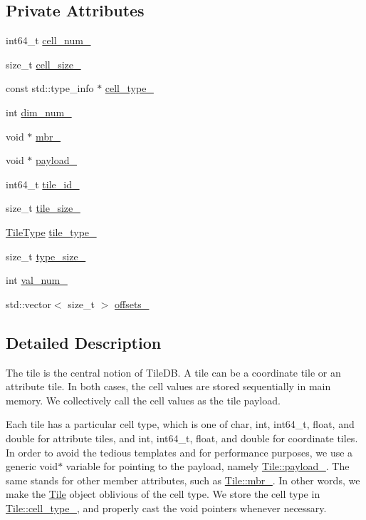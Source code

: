 \subsection*{Private Attributes}
\begin{DoxyCompactItemize}
\item 
int64\+\_\+t \hyperlink{classTile_a86e62b41be7955d73118fdc703ab84e5}{cell\+\_\+num\+\_\+}
\item 
size\+\_\+t \hyperlink{classTile_ae2cfbaf3e994027273c5ef0e73ed72f2}{cell\+\_\+size\+\_\+}
\item 
const std\+::type\+\_\+info $\ast$ \hyperlink{classTile_a9834351c4f87c33494c6938725285501}{cell\+\_\+type\+\_\+}
\item 
int \hyperlink{classTile_af1cc5abe87729af6774e2f15aac6f109}{dim\+\_\+num\+\_\+}
\item 
void $\ast$ \hyperlink{classTile_ab2ff00cb42ae4699447681611c1765f4}{mbr\+\_\+}
\item 
void $\ast$ \hyperlink{classTile_ab5aee226a2e8760db00f11b8b7ede0d2}{payload\+\_\+}
\item 
int64\+\_\+t \hyperlink{classTile_a2b9e15f1229efa4a2aff16b31ee38a29}{tile\+\_\+id\+\_\+}
\item 
size\+\_\+t \hyperlink{classTile_a7a57b326881fca47f8e60434929762fb}{tile\+\_\+size\+\_\+}
\item 
\hyperlink{classTile_a4d24e5edfa7092e2fd2d0f772e3e1433}{Tile\+Type} \hyperlink{classTile_aca1d244ab42a15bf20027943bafee10d}{tile\+\_\+type\+\_\+}
\item 
size\+\_\+t \hyperlink{classTile_a7bd705d7ae14035443f4e111d6d43f09}{type\+\_\+size\+\_\+}
\item 
int \hyperlink{classTile_ab5f3455de50e1e92d43730c120dbb9f1}{val\+\_\+num\+\_\+}
\item 
std\+::vector$<$ size\+\_\+t $>$ \hyperlink{classTile_a5cf35071b1a2f83cc2203d56c811548b}{offsets\+\_\+}
\end{DoxyCompactItemize}


\subsection{Detailed Description}
The tile is the central notion of Tile\+D\+B. A tile can be a coordinate tile or an attribute tile. In both cases, the cell values are stored sequentially in main memory. We collectively call the cell values as the tile payload.

Each tile has a particular cell type, which is one of char, int, int64\+\_\+t, float, and double for attribute tiles, and int, int64\+\_\+t, float, and double for coordinate tiles. In order to avoid the tedious templates and for performance purposes, we use a generic void$\ast$ variable for pointing to the payload, namely \hyperlink{classTile_ab5aee226a2e8760db00f11b8b7ede0d2}{Tile\+::payload\+\_\+}. The same stands for other member attributes, such as \hyperlink{classTile_ab2ff00cb42ae4699447681611c1765f4}{Tile\+::mbr\+\_\+}. In other words, we make the \hyperlink{classTile}{Tile} object oblivious of the cell type. We store the cell type in \hyperlink{classTile_a9834351c4f87c33494c6938725285501}{Tile\+::cell\+\_\+type\+\_\+}, and properly cast the void pointers whenever necessary. 

